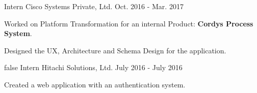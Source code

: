 \begin{cventries}
{\begin{cvitems}
      \end{cvitems}
    }
  \cventry
    {Intern}
    {Cisco Systems Private, Ltd.}
    {}
    {Oct. 2016 - Mar. 2017}
    {
      \begin{cvitems}
        \item {Worked on Platform Transformation for an internal Product: \textbf{Cordys Process System}.}
        \item {Designed the UX, Architecture and Schema Design for the application.}
      \end{cvitems} 
    }
\if false
  \cventry
    {Intern}
    {Hitachi Solutions, Ltd.}
    {}
    {July 2016 - July 2016}
    {
      \begin{cvitems}
        \item {Created a web application with an authentication system.}    
      \end{cvitems}
    }
\fi
\end{cventries}